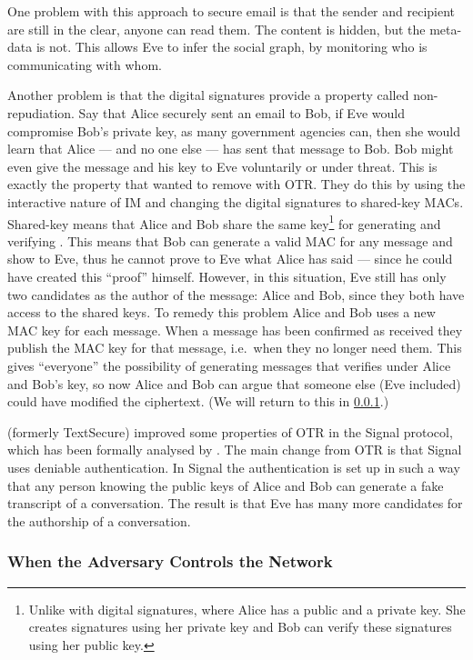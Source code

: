 One problem with this approach to secure email is that the sender and recipient
are still in the clear, anyone can read them.
The content is hidden, but the meta-data is not.
This allows Eve to infer the social graph, by monitoring who is communicating 
with whom.

Another problem is that the digital signatures provide a property called 
non-repudiation.
Say that Alice securely sent an email to Bob, if Eve would compromise Bob's 
private key, as many government agencies can, then she would learn that Alice 
--- and no one else --- has sent that message to Bob.
Bob might even give the message and his key to Eve voluntarily or under threat.
This is exactly the property that \citeauthor{otr2004} wanted to remove with 
\ac{OTR}.
They do this by using the interactive nature of \ac{IM} and changing the 
digital signatures to shared-key \acp{MAC}.
Shared-key means that Alice and Bob share the same key\footnote{%
  Unlike with digital signatures, where Alice has a public and a private key.
  She creates signatures using her private key and Bob can verify these 
  signatures using her public key.
} for generating and verifying .
This means that Bob can generate a valid \ac{MAC} for any message and show to 
Eve, thus he cannot prove to Eve what Alice has said --- since he could have 
created this \enquote{proof} himself.
However, in this situation, Eve still has only two candidates as the author of 
the message: Alice and Bob, since they both have access to the shared keys.
To remedy this problem Alice and Bob uses a new \ac{MAC} key for each message.
When a message has been confirmed as received they publish the \ac{MAC} key for 
that message, i.e.\ when they no longer need them.
This gives \enquote{everyone} the possibility of generating messages that 
verifies under Alice and Bob's key, so now Alice and Bob can argue that someone 
else (Eve included) could have modified the ciphertext.
(We will return to this in \cref{WhenAdversaryControlsNetwork}.)

\textcite{SignalApp} (formerly TextSecure) improved some properties of \ac{OTR} 
in the Signal protocol, which has been formally analysed by 
\textcite{TextSecureAnalysis,SignalProtocolAnalysis}.
The main change from \ac{OTR} is that Signal uses deniable authentication.
In Signal the authentication is set up in such a way that any person knowing 
the public keys of Alice and Bob can generate a fake transcript of 
a conversation.
The result is that Eve has many more candidates for the authorship of 
a conversation.

\subsubsection{When the Adversary Controls the Network}
\label{WhenAdversaryControlsNetwork}


